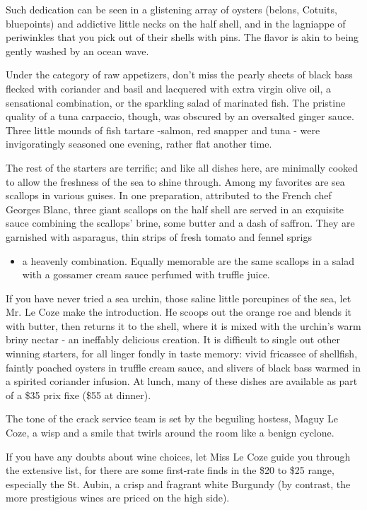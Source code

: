 Such dedication can be seen in a glistening array of oysters (belons,
Cotuits, bluepoints) and addictive little necks on the half shell, and
in the lagniappe of periwinkles that you pick out of their shells with
pins. The flavor is akin to being gently washed by an ocean wave.

Under the category of raw appetizers, don't miss the pearly sheets of
black bass flecked with coriander and basil and lacquered with extra
virgin olive oil, a sensational combination, or the sparkling salad of
marinated fish. The pristine quality of a tuna carpaccio, though, was
obscured by an oversalted ginger sauce. Three little mounds of fish
tartare -salmon, red snapper and tuna - were invigoratingly seasoned one
evening, rather flat another time.

The rest of the starters are terrific; and like all dishes here, are
minimally cooked to allow the freshness of the sea to shine through.
Among my favorites are sea scallops in various guises. In one
preparation, attributed to the French chef Georges Blanc, three giant
scallops on the half shell are served in an exquisite sauce combining
the scallops' brine, some butter and a dash of saffron. They are
garnished with asparagus, thin strips of fresh tomato and fennel sprigs

\begin{itemize}
\tightlist
\item
  a heavenly combination. Equally memorable are the same scallops in a
  salad with a gossamer cream sauce perfumed with truffle juice.
\end{itemize}

If you have never tried a sea urchin, those saline little porcupines of
the sea, let Mr. Le Coze make the introduction. He scoops out the orange
roe and blends it with butter, then returns it to the shell, where it is
mixed with the urchin's warm briny nectar - an ineffably delicious
creation. It is difficult to single out other winning starters, for all
linger fondly in taste memory: vivid fricassee of shellfish, faintly
poached oysters in truffle cream sauce, and slivers of black bass warmed
in a spirited coriander infusion. At lunch, many of these dishes are
available as part of a \$35 prix fixe (\$55 at dinner).

The tone of the crack service team is set by the beguiling hostess,
Maguy Le Coze, a wisp and a smile that twirls around the room like a
benign cyclone.

If you have any doubts about wine choices, let Miss Le Coze guide you
through the extensive list, for there are some first-rate finds in the
\$20 to \$25 range, especially the St. Aubin, a crisp and fragrant white
Burgundy (by contrast, the more prestigious wines are priced on the high
side).

